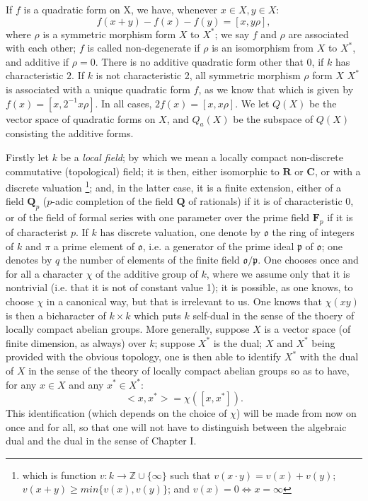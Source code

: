\documentclass[12pt]{amsart}
\newcounter{ssection}
\renewcommand{\subsection}{
  \addtocounter{ssection}{1}{\bf  \arabic{ssection}.\  }}
\begin{document}
If $f$ is a quadratic form on X, we have, whenever $x \in X, y \in X$: 
\[
f (x + y) -f(x) - f (y) = [x, y\rho], 
\]
where $\rho$ is a symmetric morphism form $X$ to $X^*$; we 
say $f$ and $\rho$ are associated with each other;
$f$ is called non-degenerate if $\rho$ is an isomorphism from $X$ to  $X^*$,
 and additive if $\rho=0$.
There is no additive quadratic form other that $0$, if $k$ has characteristic  $2$. 
If $k$ is not characteristic 2,  all symmetric morphism $\rho$ form $X$ $X^*$
is associated with a unique quadratic form $f$,
as we know that which is given by $f(x) = [x, 2^{-1}x\rho]$.
In all cases,  $2f(x)= [x, x\rho]$. We let $Q(X)$ 
be the vector space of quadratic forms on $X$,
 and $Q_a(X)$ be the subspace of $Q(X)$ consisting the additive forms. 

\subsection{}
Firstly let $k$ be a \emph{local field}; by which we mean a locally
compact non-discrete commutative (topological) field; it is then,
either isomorphic to $\mathbf{R}$ or $\mathbf{C}$, or with a discrete
valuation%
\footnote{which is function $v:k\to\mathbb{Z}\cup\{\infty\}$ such that 
$v(x\cdot y)=v(x)+v(y)$;
$v(x+y)\geq min\{v(x),v(y)\}$; and $v(x)=0\Leftrightarrow x=\infty$%
}; and, in the latter case, it is a finite extension, either of a field
$\mathbf{Q}_{p}$ ($p$-adic completion of the field $\mathbf{Q}$
of rationals) if it is of characteristic $0$, or of the field of
formal series with one parameter over the prime field $\mathbf{F}_{p}$
if it is of characterist $p$. If $k$ has discrete valuation, one
denote by $\mathfrak{o}$ the ring of integers of $k$ and $\pi$
a prime element of $\mathfrak{o}$, i.e. a generator of the prime
ideal $\mathfrak{p}$ of $\mathfrak{o}$; one denotes by $q$ the
number of elements of the finite field $\mathfrak{o}/\mathfrak{p}$.
One chooses once and for all a character $\chi$ of the additive group
of $k$, where we assume only that it is nontrivial (i.e. that it
is not of constant value 1); it is possible, as one knows, to choose
$\chi$ in a canonical way, but that is irrelevant to us. One knows
that $\chi(xy)$ is then a bicharacter of $k\times k$ which puts
$k$ self-dual in the sense of the thoery of locally compact abelian
groups. More generally, suppose $X$ is a vector space (of finite
dimension, as always) over $k$; suppose $X^{*}$ is the dual; $X$
and $X^{*}$ being provided with the obvious topology, one is then
able to identify $X^{*}$ with the dual of $X$ in the sense of the
theory of locally compact abelian groups so as to have, for any $x\in X$
and any $x^{*}\in X^{*}$:\[
<x,x^{*}>=\chi([x,x^{*}]).\]
This identification (which depends on the choice of $\chi$) will
be made from now on once and for all, so that one will not have to
distinguish between the algebraic dual and the dual in the sense of
Chapter I.
\end{document}
